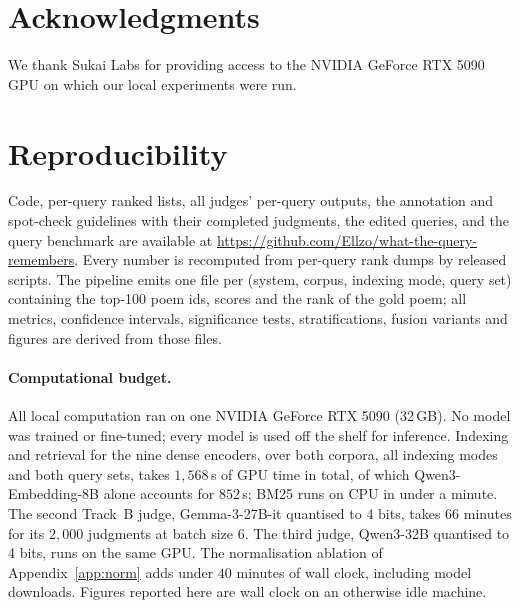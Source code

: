 \documentclass[11pt]{article}
\begin{document}
\section*{Acknowledgments}

We thank Sukai Labs for providing access to the NVIDIA GeForce RTX 5090 GPU on which our local experiments were run.



\appendix

\section{Reproducibility}
\label{app:repro}
Code, per-query ranked lists, all judges' per-query outputs, the annotation and spot-check guidelines with their completed judgments, the edited queries, and the query benchmark are available at \url{https://github.com/Ellzo/what-the-query-remembers}. Every number is recomputed from per-query rank dumps by released scripts. The pipeline emits one file per (system, corpus, indexing mode, query set) containing the top-100 poem ids, scores and the rank of the gold poem; all metrics, confidence intervals, significance tests, stratifications, fusion variants and figures are derived from those files.

\paragraph{Computational budget.} All local computation ran on one NVIDIA GeForce RTX 5090 (32\,GB). No model was trained or fine-tuned; every model is used off the shelf for inference. Indexing and retrieval for the nine dense encoders, over both corpora, all indexing modes and both query sets, takes $1{,}568$\,s of GPU time in total, of which Qwen3-Embedding-8B alone accounts for $852$\,s; BM25 runs on CPU in under a minute. The second Track~B judge, Gemma-3-27B-it quantised to 4 bits, takes $66$ minutes for its $2{,}000$ judgments at batch size 6. The third judge, Qwen3-32B quantised to 4 bits, runs on the same GPU. The normalisation ablation of Appendix~\ref{app:norm} adds under $40$ minutes of wall clock, including model downloads. Figures reported here are wall clock on an otherwise idle machine.
\end{document}
